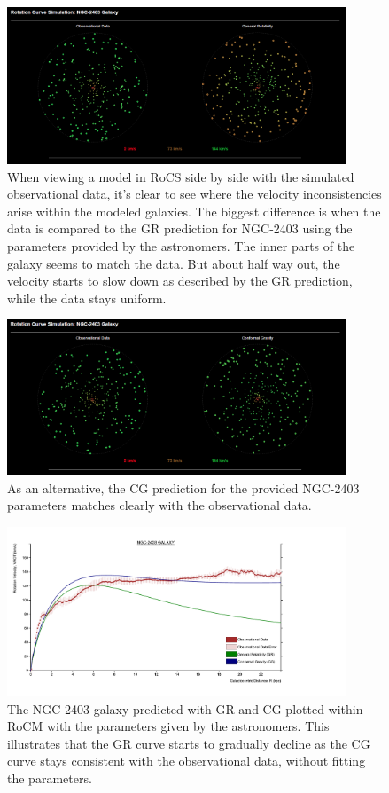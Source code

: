 \documentclass[conference]{IEEEtran-modified}
\begin{document}
\begin{figure}[h!]
\centering
\includegraphics[width=0.9\textwidth]{NGC-2403-GR}
\caption{When viewing a model in RoCS side by side with the simulated observational data, it's clear to see where the velocity inconsistencies arise within the modeled galaxies. The biggest difference is when the data is compared to the GR prediction for NGC-2403 using the parameters provided by the astronomers. The inner parts of the galaxy seems to match the data. But about half way out, the velocity starts to slow down as described by the GR prediction, while the data stays uniform.}
\label{ngc2403gr}
\end{figure}


\begin{figure}[h!]
\centering
\includegraphics[width=0.9\textwidth]{NGC-2403-CG}
\caption{As an alternative, the CG prediction for the provided NGC-2403 parameters matches clearly with the observational data.}
\label{ngc2403cg}
\end{figure}


\begin{figure}[h!]
\centering
\includegraphics[width=0.9\textwidth]{NGC-2403-DEFAULT}
\caption{The NGC-2403 galaxy predicted with GR and CG plotted within RoCM with the parameters given by the astronomers. This illustrates that the GR curve starts to gradually decline as the CG curve stays consistent with the observational data, without fitting the parameters.}
\label{ngc2403defaultplot}
\end{figure}
\end{document}
